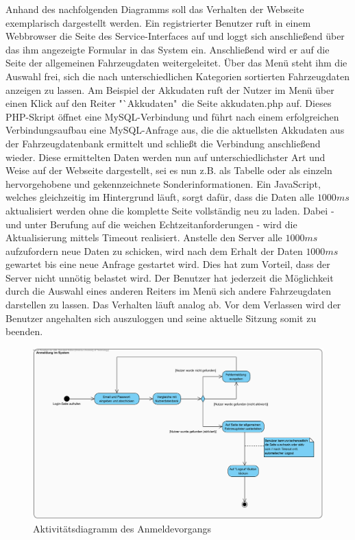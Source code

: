 \documentclass[fontsize = 12pt, paper = a4]{scrreprt}
\begin{document}
Anhand des nachfolgenden Diagramms soll das Verhalten der Webseite exemplarisch dargestellt werden. Ein registrierter Benutzer ruft in einem Webbrowser die Seite des Service-Interfaces auf und loggt sich anschließend über das ihm angezeigte Formular in das System ein. Anschließend wird er auf die Seite der allgemeinen Fahrzeugdaten weitergeleitet. Über das Menü steht ihm die Auswahl frei, sich die nach unterschiedlichen Kategorien sortierten Fahrzeugdaten anzeigen zu lassen. Am Beispiel der Akkudaten ruft der Nutzer im Menü über einen Klick auf den Reiter "`Akkudaten"\ die Seite akkudaten.php auf. Dieses PHP-Skript öffnet eine MySQL-Verbindung und führt nach einem erfolgreichen Verbindungsaufbau eine MySQL-Anfrage aus, die die aktuellsten Akkudaten aus der Fahrzeugdatenbank ermittelt und schließt die Verbindung anschließend wieder. Diese ermittelten Daten werden nun auf unterschiedlichster Art und Weise auf der Webseite dargestellt, sei es nun z.B. als Tabelle oder als einzeln hervorgehobene und gekennzeichnete Sonderinformationen.
Ein JavaScript, welches gleichzeitig im Hintergrund läuft, sorgt dafür, dass die Daten alle $1000 ms$ aktualisiert werden ohne die komplette Seite vollständig neu zu laden. Dabei - und unter Berufung auf die weichen Echtzeitanforderungen - wird die Aktualisierung mittels Timeout realisiert. Anstelle den Server alle $1000 ms$ aufzufordern neue Daten zu schicken, wird nach dem Erhalt der Daten $1000 ms$ gewartet bis eine neue Anfrage gestartet wird. Dies hat zum Vorteil, dass der Server nicht unnötig belastet wird.
Der Benutzer hat jederzeit die Möglichkeit durch die Auswahl eines anderen Reiters im Menü sich andere Fahrzeugdaten darstellen zu lassen. Das Verhalten läuft analog ab. Vor dem Verlassen wird der Benutzer angehalten sich auszuloggen und seine aktuelle Sitzung somit zu beenden. \\



\begin{figure}[h]
\centering
\includegraphics[scale = 0.6]{anmeldungsvorgang}
\caption[Aktivitätsdiagramm Anmeldevorgang]{Aktivitätsdiagramm des Anmeldevorgangs}
\label{Anmeldevorgang}
\end{figure}
\end{document}
